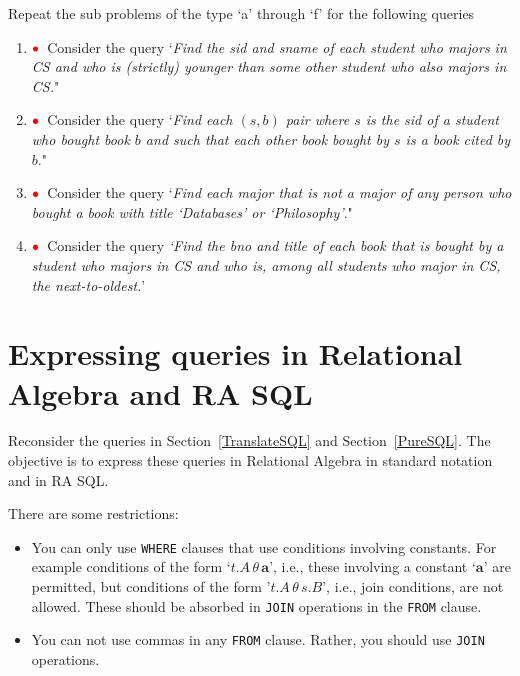 \documentclass[11pt]{article}
\newcommand{\red}[1]{{\color{red}#1}}
\newcommand{\redbullet}{$\red{\bullet}$}
\begin{document}
Repeat the sub problems of the type `a' through `f' for the following queries


\begin{enumerate}[resume]

\item \redbullet\  Consider the query `\emph{Find the sid and sname of each student who majors in CS and who is (strictly) younger than some other student who also majors in CS.}"

\item  \redbullet\ 
Consider the query `\emph{Find each $(s,b)$ pair where $s$ is the                                                                                          
sid of a student who bought book $b$ and such that                                                                                                    
each other book bought by $s$ is a book cited by $b$}."


\item  \redbullet\  Consider the query `\emph{Find each major that is not a major of any person who bought a book with title `Databases' or `Philosophy'}."


\item \redbullet\  Consider the query \emph{`Find the bno and title of
each book that is bought by a student who majors in CS and who is,
among all students who major in CS, 
the next-to-oldest.}'   



\end{enumerate}
\newpage

\section{Expressing queries in Relational Algebra and RA SQL}

Reconsider the queries in Section~\ref{TranslateSQL} and Section~\ref{PureSQL}.   The objective is to express  these queries in Relational Algebra in standard notation and in RA SQL.  

There are some restrictions:
\begin{itemize}
\item You can only use {\tt WHERE} clauses that use 
conditions involving constants.   For example conditions of the form `$t.A\, \theta\, \mathbf{a}$', i.e., these involving a constant `$\mathbf{a}$' are permitted, but conditions of the form '$t.A\, \theta\, s.B$', i.e., join conditions, are not allowed.   These should be absorbed in {\tt JOIN} operations in the {\tt FROM} clause.

\item You can not use commas in any {\tt FROM} clause.  Rather, you should use {\tt JOIN} operations.
\end{itemize}
\end{document}

